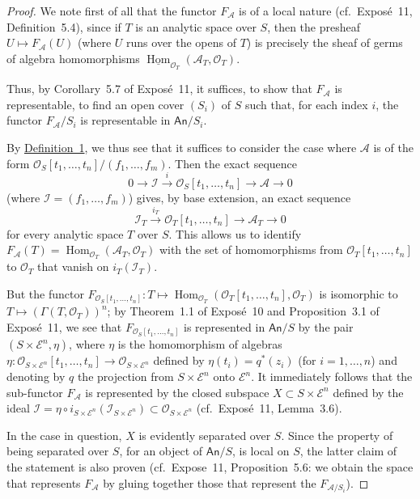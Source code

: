 \documentclass[british]{article}
\newcommand{\oldpage}[1]{\marginpar{\footnotesize$\Big\vert$ \textit{p.~#1}}}
\begin{document}
\begin{proof}
We note first of all that the functor \(F_{\mathscr{A}}\) is of a local
nature (cf.~Exposé~11, Definition~5.4), since if \(T\) is an analytic
space over \(S\), then the presheaf \(U\mapsto F_{\mathscr{A}}(U)\)
(where \(U\) runs over the opens of \(T\)) is precisely the sheaf of
germs of algebra homomorphisms
\(\underline{\operatorname{Hom}}_{{\mathscr{O}}_T}({\mathscr{A}}_T,{\mathscr{O}}_T)\).

Thus, by Corollary~5.7 of Exposé~11, it suffices, to show that
\(F_{\mathscr{A}}\) is representable, to find an open cover \((S_i)\) of
\(S\) such that, for each index \(i\), the functor
\(F_{\mathscr{A}}/S_i\) is representable in \(\mathsf{An}/S_i\).

By \hyperref[definition-1]{Definition~1}, we thus see that it suffices
to consider the case where \({\mathscr{A}}\) is of the form
\({\mathscr{O}}_S[t_1,\ldots,t_n]/(f_1,\ldots,f_m)\). Then the exact
sequence \oldpage{19-02} \[
  0 \to {\mathscr{I}} \xrightarrow{i} {\mathscr{O}}_S[t_1,\ldots,t_n] \to {\mathscr{A}}\to 0
\] (where \({\mathscr{I}}=(f_1,\ldots,f_m)\)) gives, by base extension,
an exact sequence \[
  {\mathscr{I}}_T \xrightarrow{i_T} {\mathscr{O}}_T[t_1,\ldots,t_n] \to {\mathscr{A}}_T \to 0
\] for every analytic space \(T\) over \(S\). This allows us to identify
\(F_{\mathscr{A}}(T)=\operatorname{Hom}_{{\mathscr{O}}_T}({\mathscr{A}}_T,{\mathscr{O}}_T)\)
with the set of homomorphisms from \({\mathscr{O}}_T[t_1,\ldots,t_n]\)
to \({\mathscr{O}}_T\) that vanish on \(i_T({\mathscr{I}}_T)\).

But the functor
\(F_{{\mathscr{O}}_S[t_1,\ldots,t_n]}\colon T\mapsto\operatorname{Hom}_{{\mathscr{O}}_T}({\mathscr{O}}_T[t_1,\ldots,t_n],{\mathscr{O}}_T)\)
is isomorphic to \(T\mapsto(\Gamma(T,{\mathscr{O}}_T))^n\); by
Theorem~1.1 of Exposé~10 and Proposition~3.1 of Exposé~11, we see that
\(F_{{\mathscr{O}}_S[t_1,\ldots,t_n]}\) is represented in
\(\mathsf{An}/S\) by the pair \((S\times{\mathscr{E}}^n,\eta)\), where
\(\eta\) is the homomorphism of algebras
\(\eta\colon{\mathscr{O}}_{S\times{\mathscr{E}}^n}[t_1,\ldots,t_n]\to{\mathscr{O}}_{S\times{\mathscr{E}}^n}\)
defined by \(\eta(t_i)=q^*(z_i)\) (for \(i=1,\ldots,n\)) and denoting by
\(q\) the projection from \(S\times{\mathscr{E}}^n\) onto
\({\mathscr{E}}^n\). It immediately follows that the sub-functor
\(F_{\mathscr{A}}\) is represented by the closed subspace
\(X\subset S\times{\mathscr{E}}^n\) defined by the ideal
\({\mathscr{I}}=\eta\circ i_{S\times{\mathscr{E}}^n}({\mathscr{I}}_{S\times{\mathscr{E}}^n})\subset{\mathscr{O}}_{S\times{\mathscr{E}}^n}\)
(cf.~Exposé~11, Lemma~3.6).

In the case in question, \(X\) is evidently separated over \(S\). Since
the property of being separated over \(S\), for an object of
\(\mathsf{An}/S\), is local on \(S\), the latter claim of the statement
is also proven (cf.~Expose~11, Proposition~5.6: we obtain the space that
represents \(F_{\mathscr{A}}\) by gluing together those that represent
the \(F_{{\mathscr{A}}/S_i}\)).
\end{proof}
\end{document}
